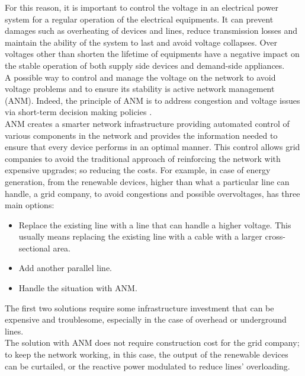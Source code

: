 For this reason, it is important to control the voltage in an electrical power system for a regular operation of the electrical equipments. It can prevent damages such as overheating of devices and lines, reduce transmission losses and maintain the ability of the system to last and avoid voltage collapses. Over voltages other than shorten the lifetime of equipments have a negative impact on the stable operation of both supply side devices and demand-side appliances. \\

A possible way to control and manage the voltage on the network to avoid voltage problems and to ensure its stability is active network management (\gls{ANM}). Indeed, the principle of \gls{ANM} is to address congestion and voltage issues via short-term decision making policies \cite{ANMQuentin}. \\
\gls{ANM} creates a smarter network infrastructure providing automated control of various components in the network and provides the information needed to ensure that every device performs in an optimal manner. This control allows grid companies to avoid the traditional approach of reinforcing the network with expensive upgrades; so reducing the costs.
For example, in case of energy generation, from the renewable devices, higher than what a particular line can handle, a grid company, to avoid congestions and possible overvoltages, has three main options:
\begin{itemize}
    \item Replace the existing line with a line that can handle a higher voltage. This usually means replacing the existing line with a cable with a larger cross-sectional area.
    \item Add another parallel line.
    \item Handle the situation with \gls{ANM}.
\end{itemize}
The first two solutions require some infrastructure investment that can be expensive and troublesome, especially in the case of overhead or underground lines.\\
The solution with \gls{ANM} does not require construction cost for the grid company; to keep the network working, in this case, the output of the renewable devices can be curtailed, or the reactive power modulated to reduce lines' overloading. \\

